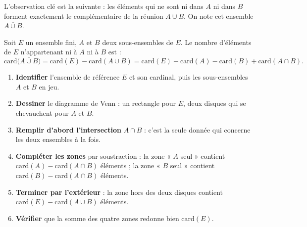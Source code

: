 \documentclass[11pt]{article}
\begin{document}
L'observation clé est la suivante : les éléments qui ne sont ni dans $A$ ni dans $B$ forment exactement le complémentaire de la réunion $A \cup B$. On note cet ensemble $\overline{A \cup B}$.

\begin{aretenir}[Formule du « ni... ni... »]
Soit $E$ un ensemble fini, $A$ et $B$ deux sous-ensembles de $E$. Le nombre d'éléments de $E$ n'appartenant ni à $A$ ni à $B$ est :
\[ \mathrm{card}\big(\overline{A \cup B}\big) = \mathrm{card}(E) - \mathrm{card}(A \cup B) = \mathrm{card}(E) - \mathrm{card}(A) - \mathrm{card}(B) + \mathrm{card}(A \cap B). \]
\end{aretenir}

\begin{methode}
\begin{enumerate}
\item \textbf{Identifier} l'ensemble de référence $E$ et son cardinal, puis les sous-ensembles $A$ et $B$ en jeu.
\item \textbf{Dessiner} le diagramme de Venn : un rectangle pour $E$, deux disques qui se chevauchent pour $A$ et $B$.
\item \textbf{Remplir d'abord l'intersection} $A \cap B$ : c'est la seule donnée qui concerne les deux ensembles à la fois.
\item \textbf{Compléter les zones} par soustraction : la zone « $A$ seul » contient $\mathrm{card}(A) - \mathrm{card}(A \cap B)$ éléments ; la zone « $B$ seul » contient $\mathrm{card}(B) - \mathrm{card}(A \cap B)$ éléments.
\item \textbf{Terminer par l'extérieur} : la zone hors des deux disques contient $\mathrm{card}(E) - \mathrm{card}(A \cup B)$ éléments.
\item \textbf{Vérifier} que la somme des quatre zones redonne bien $\mathrm{card}(E)$.
\end{enumerate}
\end{methode}
\end{document}
